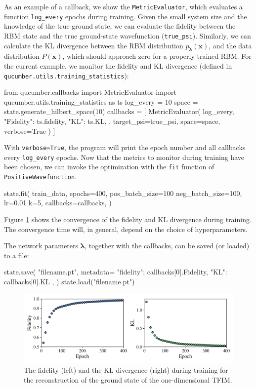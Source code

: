 \documentclass[submission, Phys, hidelnks]{SciPost}
\begin{document}
As an example of a callback, we show the \verb|MetricEvaluator|, which evaluates a function \verb|log_every| epochs during training. Given the small system size and the knowledge of the true ground state, we can evaluate the fidelity between the RBM state and the true ground-state wavefunction (\verb|true_psi|). Similarly, we can calculate the KL divergence between the RBM distribution $p_{\bm{\lambda}}(\bm{x})$, and the data distribution $P(\bm{x})$, which should approach zero for a properly trained RBM. For the current example, we monitor the fidelity and KL divergence (defined in \verb|qucumber.utils.training_statistics|):
\begin{python}
from qucumber.callbacks import MetricEvaluator
import qucumber.utils.training_statistics as ts
log_every = 10
space = state.generate_hilbert_space(10)
callbacks = [
    MetricEvaluator(
        log_every,
        {
        "Fidelity": ts.fidelity, 
        "KL": ts.KL, 
        },
    target_psi=true_psi,
    space=space,
    verbose=True
    )
]
\end{python}
With \verb|verbose=True|, the program will print the epoch number and all callbacks every \verb|log_every| epochs. Now that the metrics to monitor during training have been chosen, we can invoke the optimization with the \verb|fit| function of \verb|PositiveWavefunction|.
\begin{python}
state.fit(
    train_data,
    epochs=400,
    pos_batch_size=100
    neg_batch_size=100,
    lr=0.01
    k=5,
    callbacks=callbacks,
)
\end{python}

Figure \ref{fig:KL} shows the convergence of the fidelity and KL divergence during training. The convergence time will, in general, depend on the choice of hyperparameters.

The network parameters $\bm{\lambda}$, together with the callbacks, can be saved (or loaded) to a file:
\begin{python}
state.save(
    "filename.pt",
    metadata={
        "fidelity": callbacks[0].Fidelity,
        "KL": callbacks[0].KL
    },
)
state.load("filename.pt")
\end{python}

\begin{figure}[hbt]
    \centering{}
    \includegraphics[width=\textwidth]{fid_KL.pdf}
    \caption{\label{fig:KL} The fidelity (left) and the KL divergence (right) during training for the reconstruction of the ground state of the one-dimensional TFIM.}
\end{figure}
\end{document}
